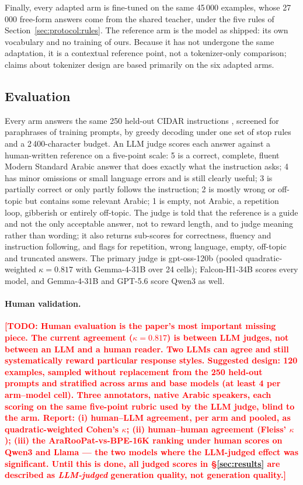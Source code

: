 \documentclass[a4paper,fleqn]{cas-sc}
\newcommand{\todo}[1]{\textcolor{red}{\textbf{[\textsc{TODO}: #1]}}}
\begin{document}
Finally, every adapted arm is fine-tuned on the same 45\,000 examples, whose 27\,000 free-form answers come from the shared teacher, under the five rules of Section~\ref{sec:protocol:rules}. The reference arm is the model as shipped: its own vocabulary and no training of ours. Because it has not undergone the same adaptation, it is a contextual reference point, not a tokenizer-only comparison; claims about tokenizer design are based primarily on the six adapted arms.

\subsection{Evaluation}
\label{sec:protocol:eval}

Every arm answers the same 250 held-out CIDAR instructions \citep{alyafeai2024cidar}, screened for paraphrases of training prompts, by greedy decoding under one set of stop rules and a 2\,400-character budget. An LLM judge scores each answer against a human-written reference on a five-point scale: 5 is a correct, complete, fluent Modern Standard Arabic answer that does exactly what the instruction asks; 4 has minor omissions or small language errors and is still clearly useful; 3 is partially correct or only partly follows the instruction; 2 is mostly wrong or off-topic but contains some relevant Arabic; 1 is empty, not Arabic, a repetition loop, gibberish or entirely off-topic. The judge is told that the reference is a guide and not the only acceptable answer, not to reward length, and to judge meaning rather than wording; it also returns sub-scores for correctness, fluency and instruction following, and flags for repetition, wrong language, empty, off-topic and truncated answers. The primary judge is gpt-oss-120b (pooled quadratic-weighted $\kappa = 0.817$ with Gemma-4-31B over 24 cells); Falcon-H1-34B scores every model, and Gemma-4-31B and GPT-5.6 score Qwen3 as well.

\paragraph{Human validation.}
\todo{Human evaluation is the paper's most important missing piece. The current agreement ($\kappa = 0.817$) is between LLM judges, not between an LLM and a human reader. Two LLMs can agree and still systematically reward particular response styles. Suggested design: 120 examples, sampled without replacement from the 250 held-out prompts and stratified across arms and base models (at least 4 per arm--model cell). Three annotators, native Arabic speakers, each scoring on the same five-point rubric used by the LLM judge, blind to the arm. Report: (i) human--LLM agreement, per arm and pooled, as quadratic-weighted Cohen's $\kappa$; (ii) human--human agreement (Fleiss' $\kappa$); (iii) the AraRooPat-vs-BPE-16K ranking under human scores on Qwen3 and Llama --- the two models where the LLM-judged effect was significant. Until this is done, all judged scores in \S\ref{sec:results} are described as \emph{LLM-judged} generation quality, not generation quality.}
\end{document}
